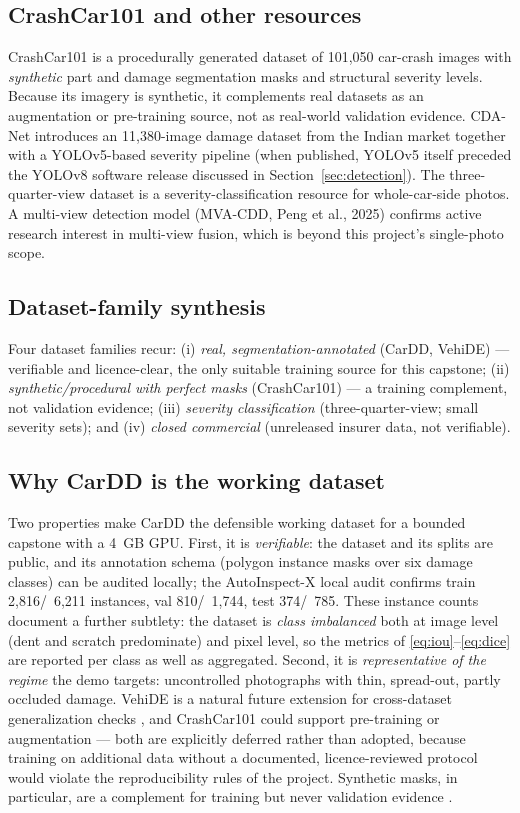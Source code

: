 \documentclass[conference]{IEEEtran}
\begin{document}
\subsection{CrashCar101 and other resources}
CrashCar101 \cite{crashcar101} is a procedurally generated dataset of 101,050
car-crash images with \emph{synthetic} part and damage segmentation masks and
structural severity levels. Because its imagery is synthetic, it complements
real datasets as an augmentation or pre-training source, not as real-world
validation evidence. CDA-Net \cite{cdanet2023} introduces an 11,380-image damage
dataset from the Indian market together with a YOLOv5-based severity pipeline
(when published, YOLOv5 itself preceded the YOLOv8 software release discussed in
Section~\ref{sec:detection}). The three-quarter-view dataset
\cite{threequarter2024} is a severity-classification resource for whole-car-side
photos. A multi-view detection model (MVA-CDD, Peng et al., 2025)
\cite{mvacdd2025} confirms active research interest in multi-view fusion, which
is beyond this project's single-photo scope.

\subsection{Dataset-family synthesis}
Four dataset families recur: (i) \emph{real, segmentation-annotated} (CarDD,
VehiDE) --- verifiable and licence-clear, the only suitable training source for
this capstone; (ii) \emph{synthetic/procedural with perfect masks}
(CrashCar101) --- a training complement, not validation evidence; (iii)
\emph{severity classification} (three-quarter-view; small severity sets); and
(iv) \emph{closed commercial} (unreleased insurer data, not verifiable).

\subsection{Why CarDD is the working dataset}
Two properties make CarDD \cite{cardd2023} the defensible working dataset for a
bounded capstone with a 4~GB GPU. First, it is \emph{verifiable}: the dataset and
its splits are public, and its annotation schema (polygon instance masks over
six damage classes) can be audited locally; the AutoInspect-X local audit
confirms train 2,816/~6,211 instances, val 810/~1,744, test 374/~785. These
instance counts document a further subtlety: the dataset is \emph{class
imbalanced} both at image level (dent and scratch predominate) and pixel level,
so the metrics of \eqref{eq:iou}--\eqref{eq:dice} are reported per class as well
as aggregated. Second, it is \emph{representative of the regime} the demo
targets: uncontrolled photographs with thin, spread-out, partly occluded damage.
VehiDE is a natural future extension for cross-dataset generalization checks
\cite{vehide2023,vehide2025}, and CrashCar101 \cite{crashcar101} could support
pre-training or augmentation --- both are explicitly deferred rather than adopted,
because training on additional data without a documented, licence-reviewed
protocol would violate the reproducibility rules of the project. Synthetic
masks, in particular, are a complement for training but never validation
evidence \cite{crashcar101}.
\end{document}
